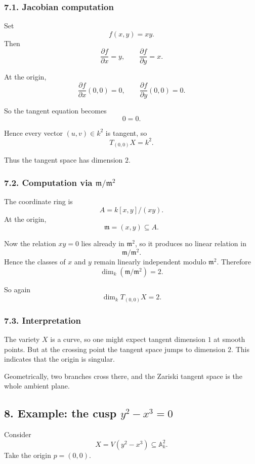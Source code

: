 \documentclass[12pt,a4paper]{article}
\theoremstyle{plain}
\theoremstyle{definition}      %
\begin{document}
	\subsubsection*{7.1. Jacobian computation}
	
	Set
	\[
	f(x,y)=xy.
	\]
	Then
	\[
	\frac{\partial f}{\partial x}=y,
	\qquad
	\frac{\partial f}{\partial y}=x.
	\]
	
	At the origin,
	\[
	\frac{\partial f}{\partial x}(0,0)=0,
	\qquad
	\frac{\partial f}{\partial y}(0,0)=0.
	\]
	
	So the tangent equation becomes
	\[
	0=0.
	\]
	
	Hence every vector \((u,v)\in k^2\) is tangent, so
	\[
	T_{(0,0)}X=k^2.
	\]
	
	Thus the tangent space has dimension \(2\).
	
	\subsubsection*{7.2. Computation via \(\mathfrak m/\mathfrak m^2\)}
	
	The coordinate ring is
	\[
	A=k[x,y]/(xy).
	\]
	At the origin,
	\[
	\mathfrak m=(x,y)\subseteq A.
	\]
	
	Now the relation \(xy=0\) lies already in \(\mathfrak m^2\), so it produces no linear relation in
	\[
	\mathfrak m/\mathfrak m^2.
	\]
	Hence the classes of \(x\) and \(y\) remain linearly independent modulo \(\mathfrak m^2\). Therefore
	\[
	\dim_k(\mathfrak m/\mathfrak m^2)=2.
	\]
	
	So again
	\[
	\dim_k T_{(0,0)}X=2.
	\]
	
	\subsubsection*{7.3. Interpretation}
	
	The variety \(X\) is a curve, so one might expect tangent dimension \(1\) at smooth points. But at the crossing point the tangent space jumps to dimension \(2\). This indicates that the origin is singular.
	
	Geometrically, two branches cross there, and the Zariski tangent space is the whole ambient plane.
	
	\subsection*{8. Example: the cusp \(y^2-x^3=0\)}
	
	Consider
	\[
	X=V(y^2-x^3)\subseteq \mathbb A_k^2.
	\]
	Take the origin \(p=(0,0)\).
	
\end{document}
